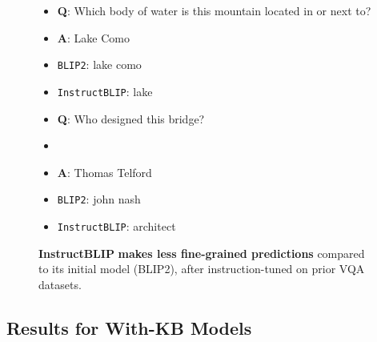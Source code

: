\documentclass[11pt]{article}
\begin{document}
\begin{figure}
  \centering
  \scriptsize
  \begin{minipage}[t]{0.22\textwidth}
    \centering

    \begin{itemize}[nosep, align=left, leftmargin=*,label={}]
      \item \textsf{\textbf{Q}:  Which body of water is this mountain located in or next to?}
      \item \textsf{\textbf{A}:  Lake Como}
      \item \textsf{\texttt{BLIP2}: lake como}
      \item \textsf{\texttt{InstructBLIP}: \textcolor{myred}{lake}}
    \end{itemize}
  \end{minipage}
  \hfill
  \begin{minipage}[t]{0.25\textwidth}
    \centering
    
    \begin{itemize}[nosep, align=left, leftmargin=*,label={}]
      \item \textsf{\textbf{Q}: Who designed this bridge?}
      \item
      \item \textsf{\textbf{A}: Thomas Telford}
      \item \textsf{\texttt{BLIP2}: john nash}
      \item \textsf{\texttt{InstructBLIP}: \textcolor{myred}{architect}}
    \end{itemize}
  \end{minipage}
  \vspace{-2mm}
  \caption{\textbf{InstructBLIP} \textbf{makes less fine-grained predictions} compared to its initial model (BLIP2), after instruction-tuned on prior VQA datasets.}
  \label{fig:instruct_error}
  \vspace{-4mm}
\end{figure} \subsection{Results for With-KB Models}
\label{subsec:results_withkb}
\end{document}
